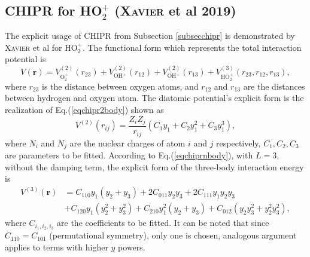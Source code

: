 \documentclass[12pt]{article}
\begin{document}
\subsection{CHIPR for HO$_2^+$ (\textsc{Xavier} et al 2019)}
\label{subchiprho2}
The explicit usage of CHIPR from Subsection \ref{subsecchipr} is demonstrated by \textsc{Xavier} et al \cite{idx173} for HO$_2^+$. The functional form which represents the total interaction potential is
\begin{equation}
    V(\mathbf{r}) = V^{(2)}_{\text{O$_2^+$}}(r_{23}) + V^{(2)}_{\text{OH$^+$}}(r_{12}) + V^{(2)}_{\text{OH$^+$}}(r_{13}) +
    V^{(3)}_{\text{HO$_2^+$}}{(r_{23}, r_{12}, r_{13})},
    \label{eq:ho2+chipr}
\end{equation}
where $r_{23}$ is the distance between oxygen atoms, and $r_{12}$ and $r_{13}$ are the distances between hydrogen and oxygen atom. The diatomic potential's explicit form is the realization of Eq.(\ref{eqchipr2body}) shown as
\begin{equation}
    V^{(2)}(r_{ij}) = \frac{Z_iZ_j}{r_{ij}}(C_1y_1 + C_2y_1^2 + C_3y_1^3),
    \label{eq:ho2+chiprv2}
\end{equation}
where $N_i$ and $N_j$ are the nuclear charges of atom $i$ and $j$ respectively, $C_1,C_2,C_3$ are parameters to be fitted.
According to Eq.(\ref{eqchiprnbody}), with $L = 3$, without the damping term, the explicit form of the three-body interaction energy is
\begin{equation}
    \begin{split}
        V^{(3)}(\mathbf{r}) &= C_{110}y_1(y_2 + y_3) + 2C_{011}y_2y_3 +
        2C_{111}y_1y_2y_3 
        \\&+ C_{120}y_1(y_2^2 + y_3^2) + C_{210}y_1^2(y_2+y_3) + C_{012}(y_2y_3^2 + y_2^2y_3^2),
    \end{split}
    \label{eq:ho2+chiprv3}
\end{equation}
where $C_{i_1,i_2,i_3}$ are the coefficients to be fitted. It can be noted that since $C_{110} = C_{101}$ (permutational symmetry), only one is chosen, analogous argument applies to terms with higher $y$ powers.  
\end{document}
